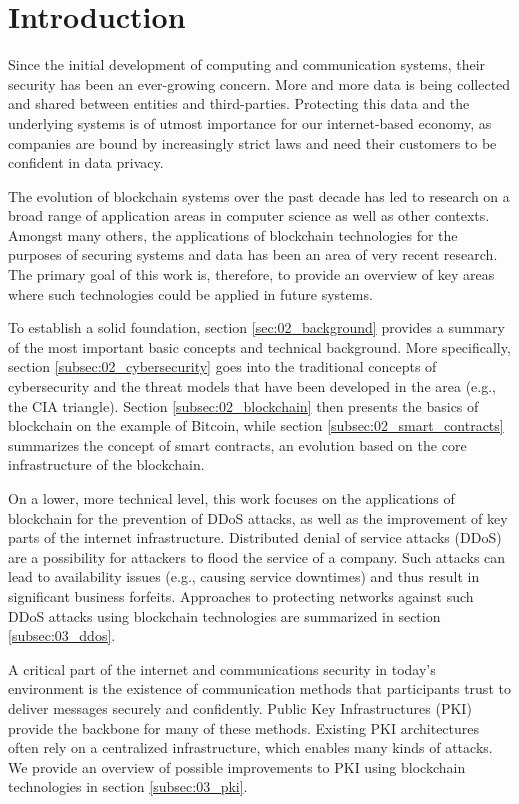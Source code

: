 \section{Introduction}

Since the initial development of computing and communication systems, their security has been an ever-growing concern. More and more data is being collected and shared between entities and third-parties. Protecting this data and the underlying systems is of utmost importance for our internet-based economy, as companies are bound by increasingly strict laws and need their customers to be confident in data privacy.

The evolution of blockchain systems over the past decade has led to research on a broad range of application areas in computer science as well as other contexts. Amongst many others, the applications of blockchain technologies for the purposes of securing systems and data has been an area of very recent research. The primary goal of this work is, therefore, to provide an overview of key areas where such technologies could be applied in future systems.

To establish a solid foundation, section \ref{sec:02_background} provides a summary of the most important basic concepts and technical background. More specifically, section \ref{subsec:02_cybersecurity} goes into the traditional concepts of cybersecurity and the threat models that have been developed in the area (e.g., the CIA triangle). Section \ref{subsec:02_blockchain} then presents the basics of blockchain on the example of Bitcoin, while section \ref{subsec:02_smart_contracts} summarizes the concept of smart contracts, an evolution based on the core infrastructure of the blockchain.

On a lower, more technical level, this work focuses on the applications of blockchain for the prevention of DDoS attacks, as well as the improvement of key parts of the internet infrastructure. Distributed denial of service attacks (DDoS) are a possibility for attackers to flood the service of a company. Such attacks can lead to availability issues (e.g., causing service downtimes) and thus result in significant business forfeits. Approaches to protecting networks against such DDoS attacks using blockchain technologies are summarized in section \ref{subsec:03_ddos}.

A critical part of the internet and communications security in today's environment is the existence of communication methods that participants trust to deliver messages securely and confidently. Public Key Infrastructures (PKI) provide the backbone for many of these methods. Existing PKI architectures often rely on a centralized infrastructure, which enables many kinds of attacks. We provide an overview of possible improvements to PKI using blockchain technologies in section \ref{subsec:03_pki}.

